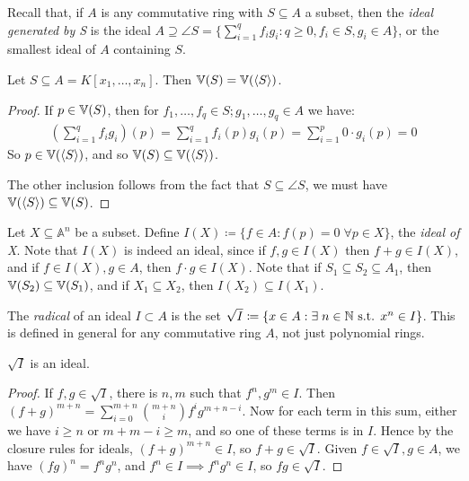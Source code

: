 \documentclass[10pt,a4paper,rgb]{article}
\begin{document}
Recall that, if $A$ is any commutative ring with $S \subseteq A$ a subset, then the \emph{ideal generated by S} is the ideal $A \supseteq \angle{S} = \{\sum_{i=1}^q f_ig_i : q \geq 0, f_i \in S, g_i \in A\}$, or the smallest ideal of $A$ containing $S$.

\begin{lemma}
Let $S \subseteq A = K[x_1, \ldots, x_n]$. Then $\mathbb{V}(S) = \mathbb{V}(\langle S \rangle)$.
\end{lemma}
\begin{proof}
If $p \in \mathbb{V}(S)$, then for $f_1, \ldots, f_q \in S; g_1, \ldots, g_q \in A$ we have:
\begin{align*}
\left(\sum_{i=1}^q f_ig_i\right)(p) = \sum_{i=1}^q f_i(p)g_i(p) = \sum_{i=1}^p 0\cdot g_i(p) = 0
\end{align*}
So $p \in \mathbb{V}(\langle S \rangle)$, and so $\mathbb{V}(S)\subseteq \mathbb{V}(\langle S \rangle)$. 

\hspace*{-1em}The other inclusion follows from the fact that $S \subseteq \angle{S}$, we must have $\mathbb{V}(\langle S \rangle) \subseteq \mathbb{V}(S)$.
\end{proof}

Let $X \subseteq \mathbb{A}^n$ be a subset. Define $I(X) \coloneqq \{f \in A : f(p) = 0 \;\forall p \in X\}$, the \emph{ideal of X}. Note that $I(X)$ is indeed an ideal, since if $f, g \in I(X)$ then $f+g \in I(X)$, and if $f \in I(X), g \in A$, then $f\cdot g \in I(X)$. Note that if $S_1\subseteq S_2 \subseteq A_1$, then $\mathbb{V}(S_2) \subseteq \mathbb{V}(S_1)$, and if $X_1 \subseteq X_2$, then $I(X_2) \subseteq I(X_1)$.

The \emph{radical} of an ideal $I \subset A$ is the set $\sqrt{I} \coloneqq \{x \in A: \exists n\in\N \st x^n \in I\}$. This is defined in general for any commutative ring $A$, not just polynomial rings.

\begin{lemma}
$\sqrt{I}$ is an ideal.
\end{lemma}
\begin{proof}
If $f, g \in \sqrt{I}$, there is $n, m$ such that $f^n, g^m \in I$. Then $(f+g)^{m+n} = \sum_{i=0}^{m+n} \binom{m+n}{i}f^i g^{m+n-i}$. Now for each term in this sum, either we have $i \geq n$ or $m+m-i\geq m$, and so one of these terms is in $I$. Hence by the closure rules for ideals, $(f+g)^{m+n} \in I$, so $f+g \in \sqrt{I}$. Given $f \in \sqrt{I}, g \in A$, we have $(fg)^n = f^n g^n$, and $f^n \in I \implies f^ng^n \in I$, so $fg \in \sqrt{I}$.
\end{proof}
\end{document}
